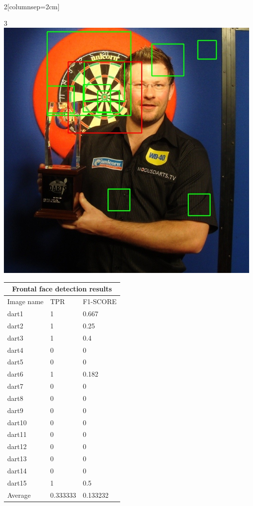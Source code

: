 \documentclass{article}
\begin{document}
\begin{multicols}{2}[columnsep=2cm]
\begin{multicols}{3}
    \includegraphics[width=\linewidth]{dart4-dart.jpg}\par
\end{multicols}
\label{fig:vjdartsimages}


\begin{tabular}{ |p{2cm}||p{2cm}|p{2cm}| }
 \hline
 \multicolumn{3}{|c|}{Frontal face detection results} \\
 \hline
 Image name & TPR & F1-SCORE \\
 \hline
 dart1  & 1  & 0.667   \\
 dart2  & 1  & 0.25       \\
 dart3  & 1  & 0.4        \\
 dart4  & 0  & 0          \\
 dart5  & 0  & 0          \\
 dart6  & 1  & 0.182   \\
 dart7  & 0  & 0          \\
 dart8  & 0  & 0          \\
 dart9  & 0  & 0          \\
 dart10 & 0  & 0          \\
 dart11 & 0  & 0          \\
 dart12 & 0  & 0          \\
 dart13 & 0  & 0          \\
 dart14 & 0  & 0          \\
 dart15 & 1  & 0.5        \\
 \hline
 Average& 0.333333  & 0.133232    \\ 
 \hline
\end{tabular}
\label{tab:vjdartstable}


\end{multicols}
\end{document}
